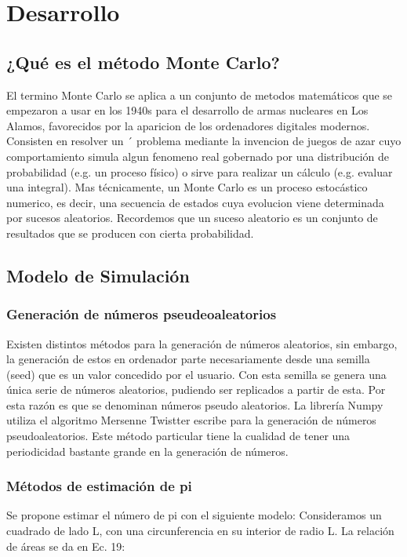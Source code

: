 \documentclass{article}
\begin{document}
\section{Desarrollo}
\subsection{¿Qué es el método Monte Carlo?}
El termino Monte Carlo se aplica a un conjunto de metodos matemáticos que se empezaron a usar en los 1940s para el desarrollo de armas nucleares en Los Alamos, favorecidos por la aparicion de los ordenadores digitales modernos. Consisten en resolver un ´
problema mediante la invencion de juegos de azar cuyo comportamiento simula algun
fenomeno real gobernado por una distribución de probabilidad (e.g. un proceso físico) o
sirve para realizar un cálculo (e.g. evaluar una integral).
Mas técnicamente, un Monte Carlo es un proceso estocástico numerico, es decir, una 
secuencia de estados cuya evolucion viene determinada por sucesos aleatorios. Recordemos que un suceso aleatorio es un conjunto de resultados que se producen con cierta
probabilidad\cite{ff2}.

\subsection{Modelo de Simulación}

\subsubsection{Generación de números pseudeoaleatorios}
Existen distintos métodos para la generación de números aleatorios, sin embargo, la generación de estos en ordenador parte necesariamente desde una semilla (seed) que es un valor concedido por el usuario. Con esta semilla se genera una única serie de números aleatorios, pudiendo ser replicados a partir de esta. Por esta razón es que se denominan números pseudo aleatorios. La librería Numpy utiliza el algoritmo Mersenne Twistter escribe para la generación de números pseudoaleatorios. Este método particular tiene la cualidad de tener una periodicidad bastante grande en la generación de números\cite{ff2}.

\subsubsection{Métodos de estimación de pi}
Se propone estimar el número de pi con el siguiente modelo: Consideramos un cuadrado de lado L, con una circunferencia en su interior de radio L. La relación de áreas se da en Ec. 19\cite{ff2}:
\end{document}
